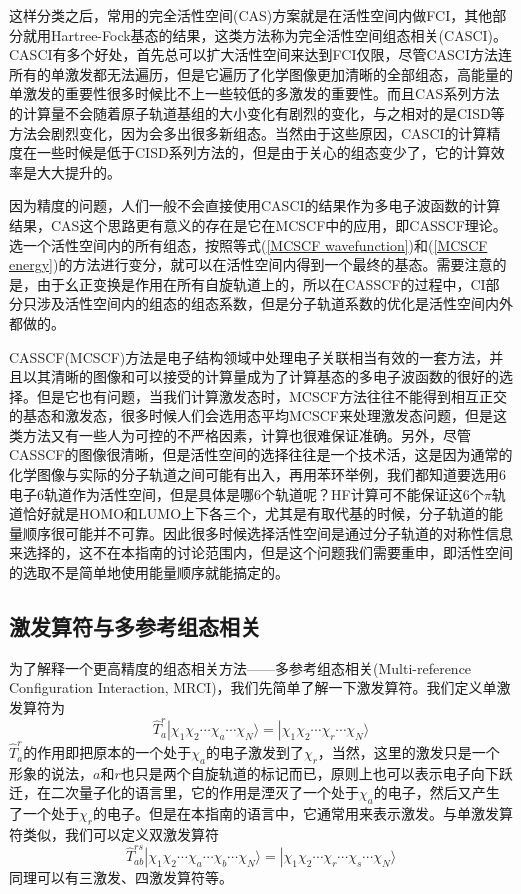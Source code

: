\documentclass[12pt,a4paper,openany,twoside]{book}
\numberwithin{equation}{section}
\begin{document}
          这样分类之后，常用的完全活性空间(CAS)方案就是在活性空间内做FCI，其他部分就用Hartree-Fock基态的结果，这类方法称为完全活性空间组态相关(CASCI)。CASCI有多个好处，首先总可以扩大活性空间来达到FCI仅限，尽管CASCI方法连所有的单激发都无法遍历，但是它遍历了化学图像更加清晰的全部组态，高能量的单激发的重要性很多时候比不上一些较低的多激发的重要性。而且CAS系列方法的计算量不会随着原子轨道基组的大小变化有剧烈的变化，与之相对的是CISD等方法会剧烈变化，因为会多出很多新组态。当然由于这些原因，CASCI的计算精度在一些时候是低于CISD系列方法的，但是由于关心的组态变少了，它的计算效率是大大提升的。

          因为精度的问题，人们一般不会直接使用CASCI的结果作为多电子波函数的计算结果，CAS这个思路更有意义的存在是它在MCSCF中的应用，即CASSCF理论。选一个活性空间内的所有组态，按照等式(\ref{MCSCF wavefunction})和(\ref{MCSCF energy})的方法进行变分，就可以在活性空间内得到一个最终的基态。需要注意的是，由于幺正变换是作用在所有自旋轨道上的，所以在CASSCF的过程中，CI部分只涉及活性空间内的组态的组态系数，但是分子轨道系数的优化是活性空间内外都做的。

          CASSCF(MCSCF)方法是电子结构领域中处理电子关联相当有效的一套方法，并且以其清晰的图像和可以接受的计算量成为了计算基态的多电子波函数的很好的选择。但是它也有问题，当我们计算激发态时，MCSCF方法往往不能得到相互正交的基态和激发态，很多时候人们会选用态平均MCSCF来处理激发态问题，但是这类方法又有一些人为可控的不严格因素，计算也很难保证准确。另外，尽管CASSCF的图像很清晰，但是活性空间的选择往往是一个技术活，这是因为通常的化学图像与实际的分子轨道之间可能有出入，再用苯环举例，我们都知道要选用6电子6轨道作为活性空间，但是具体是哪6个轨道呢？HF计算可不能保证这6个$\pi$轨道恰好就是HOMO和LUMO上下各三个，尤其是有取代基的时候，分子轨道的能量顺序很可能并不可靠。因此很多时候选择活性空间是通过分子轨道的对称性信息来选择的，这不在本指南的讨论范围内，但是这个问题我们需要重申，即活性空间的选取不是简单地使用能量顺序就能搞定的。
        \subsection{激发算符与多参考组态相关}
          为了解释一个更高精度的组态相关方法——多参考组态相关(Multi-reference Configuration Interaction, MRCI)，我们先简单了解一下激发算符。我们定义单激发算符为
          \begin{equation}
            \hat{T}_a^r|\chi_1\chi_2\cdots\chi_a\cdots\chi_N\rangle = |\chi_1\chi_2\cdots\chi_r\cdots\chi_N\rangle
            \label{single excitation operator}
          \end{equation}
          $\hat{T}_a^r$的作用即把原本的一个处于$\chi_a$的电子激发到了$\chi_r$，当然，这里的激发只是一个形象的说法，$a$和$r$也只是两个自旋轨道的标记而已，原则上也可以表示电子向下跃迁，在二次量子化的语言里，它的作用是湮灭了一个处于$\chi_a$的电子，然后又产生了一个处于$\chi_r$的电子。但是在本指南的语言中，它通常用来表示激发。与单激发算符类似，我们可以定义双激发算符
          \begin{equation}
            \hat{T}_{ab}^{rs}|\chi_1\chi_2\cdots\chi_a\cdots\chi_b\cdots\chi_N\rangle = |\chi_1\chi_2\cdots\chi_r\cdots\chi_s\cdots\chi_N\rangle
            \label{double excitation operator}
          \end{equation}
          同理可以有三激发、四激发算符等。
          
\end{document}
